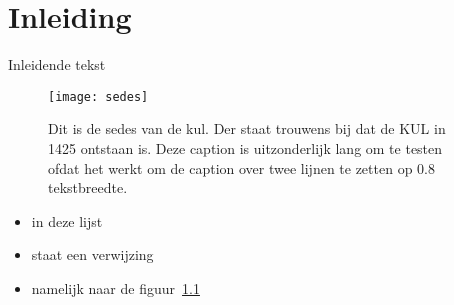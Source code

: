 
\chapter{Inleiding}
\label{cha:inleiding}

Inleidende tekst
\begin{figure}
  \centering
  \texttt{[image: sedes]}
  \caption{Dit is de sedes van  de kul. Der staat trouwens bij dat de KUL  in 1425 ontstaan is. Deze
    caption is  uitzonderlijk lang om te  testen ofdat het werkt  om de caption over  twee lijnen te
    zetten op 0.8 tekstbreedte.}
  \label{fig:sedes}
\end{figure}

\begin{itemize}
\item in deze lijst
\item staat een verwijzing
\item namelijk naar de figuur~\ref{fig:sedes}
\end{itemize}


